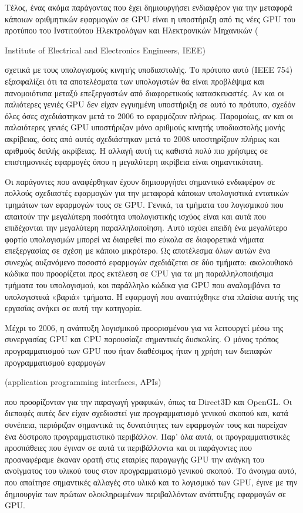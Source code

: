 Τέλος, ένας ακόμα παράγοντας που έχει δημιουργήσει ενδιαφέρον για την μεταφορά κάποιων αριθμητικών εφαρμογών σε GPU είναι η υποστήριξη από τις νέες GPU του προτύπου του Ινστιτούτου Ηλεκτρολόγων και Ηλεκτρονικών Μηχανικών (\begin{english}Institute of Electrical and Electronics Engineers, IEEE)\end{english} σχετικά με τους υπολογισμούς κινητής υποδιαστολής. Το πρότυπο αυτό (ΙΕΕΕ 754) εξασφαλίζει ότι τα αποτελέσματα των υπολογιστών θα είναι προβλέψιμα και πανομοιότυπα μεταξύ επεξεργαστών από διαφορετικούς κατασκευαστές. Αν και οι παλιότερες γενιές GPU  δεν είχαν εγγυημένη υποστήριξη σε αυτό το πρότυπο, σχεδόν όλες όσες σχεδιάστηκαν μετά το 2006 το εφαρμόζουν πλήρως. Παρομοίως, αν και οι παλαιότερες γενιές GPU υποστήριζαν μόνο αριθμούς κινητής υποδιαστολής μονής ακρίβειας, όσες από αυτές σχεδιάστηκαν μετά το 2008 υποστηρίζουν πλήρως και αριθμούς διπλής ακρίβειας. Η αλλαγή αυτή τις καθιστά πολύ πιο χρήσιμες σε επιστημονικές εφαρμογές όπου η μεγαλύτερη ακρίβεια είναι σημαντικότατη.   

Οι παράγοντες που αναφέρθηκαν έχουν δημιουργήσει σημαντικό ενδιαφέρον σε πολλούς σχεδιαστές εφαρμογών για την μεταφορά κάποιων υπολογιστικά εντατικών τμημάτων των εφαρμογών τους σε GPU. Γενικά, τα τμήματα του λογισμικού που απαιτούν την μεγαλύτερη ποσότητα υπολογιστικής ισχύος είναι και αυτά που επιδέχονται την μεγαλύτερη παραλληλοποίηση. Αυτό ισχύει επειδή ένα μεγαλύτερο φορτίο υπολογισμών μπορεί να διαιρεθεί πιο εύκολα σε διαφορετικά νήματα επεξεργασίας σε σχέση με κάποιο μικρότερο. Ως αποτέλεσμα όλων αυτών ένα συνεχώς αυξανόμενο ποσοστό εφαρμογών σχεδιάζεται σε δύο τμήματα: ακολουθιακό κώδικα που προορίζεται προς εκτέλεση σε CPU για τα μη παραλληλοποιήσιμα τμήματα του υπολογισμού, και παράλληλο κώδικα για GPU που αναλαμβάνει τα υπολογιστικά «βαριά» τμήματα. Η εφαρμογή που αναπτύχθηκε στα πλαίσια αυτής της εργασίας ανήκει σε αυτή την κατηγορία.

Μέχρι το 2006, η ανάπτυξη λογισμικού προορισμένου για να λειτουργεί μέσω της συνεργασίας GPU και CPU παρουσίαζε σημαντικές δυσκολίες. Ο μόνος τρόπος προγραμματισμού των GPU που ήταν διαθέσιμος ήταν η χρήση των διεπαφών προγραμματισμού εφαρμογών\begin{english} (application programming interfaces, APIs)\end{english} που προορίζονταν για την παραγωγή γραφικών, όπως τα Direct3D και OpenGL. Οι διεπαφές αυτές δεν είχαν σχεδιαστεί για προγραμματισμό γενικού σκοπού και, κατά συνέπεια, περιόριζαν σημαντικά τις δυνατότητες των εφαρμογών τους και παρείχαν ένα δύστροπο προγραμματιστικό περιβάλλον. Παρ' όλα αυτά, οι προγραμματιστικές προσπάθειες που έγιναν σε αυτά τα περιβάλλοντα και οι παράγοντες που προαναφέραμε έκαναν ορατή στις εταιρίες παραγωγής GPU την ανάγκη του ανοίγματος του υλικού τους στον προγραμματισμό γενικού σκοπού. Το άνοιγμα αυτό, που απαίτησε σημαντικές αλλαγές στο υλικό και το λογισμικό των GPU, έγινε με την δημιουργία των πρώτων ολοκληρωμένων περιβαλλόντων ανάπτυξης εφαρμογών σε GPU.
   
